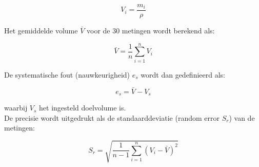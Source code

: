 \begin{equation} V_i = \frac{m_i}{\rho} \end{equation}

Het gemiddelde volume $\bar{V}$ voor de 30 metingen wordt berekend als:

\begin{equation} \bar{V} = \frac{1}{n} \sum_{i=1}^{n} V_i \end{equation}

De systematische fout (nauwkeurigheid) $e_s$ wordt dan gedefinieerd als:

\begin{equation} e_s = \bar{V} - V_s \end{equation}

waarbij $V_s$ het ingesteld doelvolume is. 
\\[12pt]De precisie wordt uitgedrukt als de standaarddeviatie (random error $S_r$) van de metingen:

\begin{equation} S_r = \sqrt{ \frac{1}{n-1} \sum_{i=1}^{n} {(V_i - \bar{V})}^2 } \end{equation}